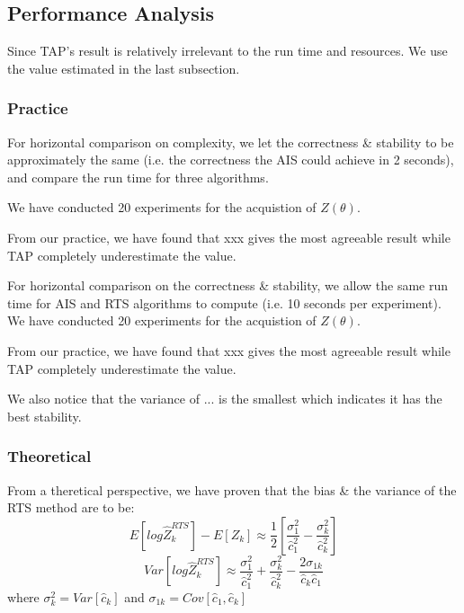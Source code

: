 

\subsection{Performance Analysis}

Since TAP's result is relatively irrelevant to the run time and resources. We use the value estimated in the last subsection.

\subsubsection{Practice}
For horizontal comparison on complexity, we let the correctness \& stability to be approximately the same (i.e. the correctness the AIS could achieve in 2 seconds), and compare the run time for three algorithms.

We have conducted 20 experiments for the acquistion of $Z(\theta)$.

From our practice, we have found that xxx gives the most agreeable result while TAP completely underestimate the value.


For horizontal comparison on the correctness \& stability, we allow the same run time for AIS and RTS algorithms to compute (i.e. 10 seconds per experiment). We have conducted 20 experiments for the acquistion of $Z(\theta)$.

From our practice, we have found that xxx gives the most agreeable result while TAP completely underestimate the value.

We also notice that the variance of ... is the smallest which indicates it has the best stability.



\subsubsection{Theoretical}
From a theretical perspective, we have proven that the bias \& the variance of the RTS method are to be:
\begin{equation}
E{[ log \hat{Z}_{k}^{RTS} ]} - E{[Z_{k}]} \approx \frac{1}{2}{[\frac{\sigma^{2}_{1}}{\hat{c}^{2}_{1}}-\frac{\sigma^{2}_{k}}{\hat{c}^{2}_{k}}]} 
\end{equation}
\begin{equation}
Var{[ log \hat{Z}_{k}^{RTS} ]} \approx \frac{\sigma^{2}_{1}}{\hat{c}^{2}_{1}} + \frac{\sigma^{2}_{k}}{\hat{c}^{2}_{k}} - \frac{2\sigma_{1k}}{\hat{c}_{k}\hat{c}_{1}}
\end{equation}
where $\sigma^{2}_{k} = Var{[\hat{c}_{k}]}$ and $\sigma_{1k} = Cov{[\hat{c}_{1},\hat{c}_{k}]}$

